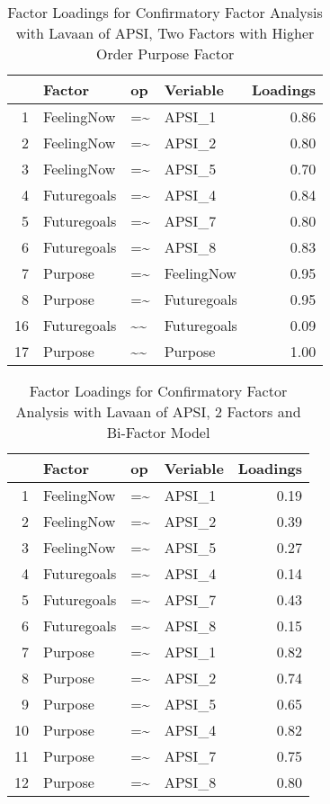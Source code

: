 \documentclass{article}\usepackage[]{graphicx}\usepackage[]{color}
\begin{document}
\begin{table}[ht]
\centering
\begin{tabular}{rlllr}
  \hline
 & Factor & op & Veriable & Loadings \\ 
  \hline
1 & FeelingNow & =\~{} & APSI\_1 & 0.86 \\ 
  2 & FeelingNow & =\~{} & APSI\_2 & 0.80 \\ 
  3 & FeelingNow & =\~{} & APSI\_5 & 0.70 \\ 
  4 & Futuregoals & =\~{} & APSI\_4 & 0.84 \\ 
  5 & Futuregoals & =\~{} & APSI\_7 & 0.80 \\ 
  6 & Futuregoals & =\~{} & APSI\_8 & 0.83 \\ 
  7 & Purpose & =\~{} & FeelingNow & 0.95 \\ 
  8 & Purpose & =\~{} & Futuregoals & 0.95 \\ 
  16 & Futuregoals & \~{}\~{} & Futuregoals & 0.09 \\ 
  17 & Purpose & \~{}\~{} & Purpose & 1.00 \\ 
   \hline
\end{tabular}
\caption{Factor Loadings for Confirmatory Factor Analysis with Lavaan of APSI, Two Factors with Higher Order Purpose Factor} 
\end{table}
\begin{table}[ht]
\centering
\begin{tabular}{rlllr}
  \hline
 & Factor & op & Veriable & Loadings \\ 
  \hline
1 & FeelingNow & =\~{} & APSI\_1 & 0.19 \\ 
  2 & FeelingNow & =\~{} & APSI\_2 & 0.39 \\ 
  3 & FeelingNow & =\~{} & APSI\_5 & 0.27 \\ 
  4 & Futuregoals & =\~{} & APSI\_4 & 0.14 \\ 
  5 & Futuregoals & =\~{} & APSI\_7 & 0.43 \\ 
  6 & Futuregoals & =\~{} & APSI\_8 & 0.15 \\ 
  7 & Purpose & =\~{} & APSI\_1 & 0.82 \\ 
  8 & Purpose & =\~{} & APSI\_2 & 0.74 \\ 
  9 & Purpose & =\~{} & APSI\_5 & 0.65 \\ 
  10 & Purpose & =\~{} & APSI\_4 & 0.82 \\ 
  11 & Purpose & =\~{} & APSI\_7 & 0.75 \\ 
  12 & Purpose & =\~{} & APSI\_8 & 0.80 \\ 
   \hline
\end{tabular}
\caption{Factor Loadings for Confirmatory Factor Analysis with Lavaan of APSI, 2 Factors and Bi-Factor Model} 
\end{table}
\end{document}
